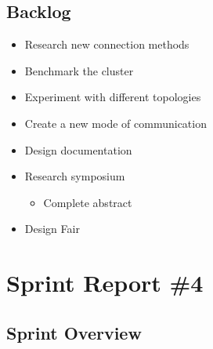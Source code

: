 \subsection*{Backlog}
\begin{itemize}
	\item Research new connection methods
	\item Benchmark the cluster
	\item Experiment with different topologies
	\item Create a new mode of communication
	\item Design documentation
	\item Research symposium
	\begin{itemize}
		\item Complete abstract
	\end{itemize}
	\item Design Fair
\end{itemize}

\section{Sprint Report \#4}

\subsection*{Sprint Overview}
